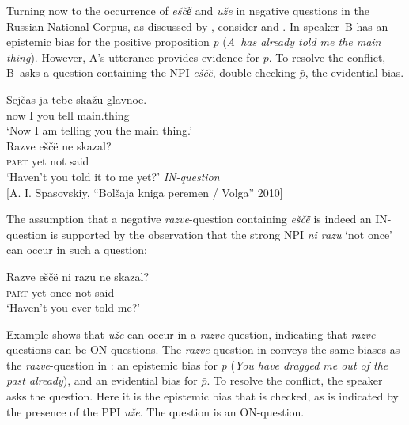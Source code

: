 \documentclass[output=paper,colorlinks,citecolor=brown]{langscibook}
\begin{document}
\noindent Turning now  to the occurrence of \textit{eščё} and \textit{uže} in negative questions in the Russian National Corpus, as discussed by \citet{ReppGeistToAppear}, consider  and . In  speaker~B has an epistemic bias for the positive proposition \textit{p} (\textit{A~has already told me the main thing}). However, A’s utterance provides evidence for $\bar{p}$. To resolve the conflict, B~asks a question containing the NPI \textit{eščë}, double-checking $\bar{p}$, the evidential bias.


\ea\label{geist-repp:ex:skazuGlavnoe}
\begin{xlist}[M:]
     \gll Sejčas	ja	tebe	skažu	glavnoe.\\
now	I	you	tell	main.thing\\
\glt ‘Now I am telling you the main thing.’\\
\gll Razve	eščë	ne	skazal?\\
\textsc{part}	yet	not	said\\
\glt ‘Haven't you told it to me yet?’ \hfill \textit{IN-question}\\
\hfill [A. I. Spasovskiy, “Bolšaja kniga peremen / Volga” 2010]
\end{xlist}
\z

\noindent The assumption that a negative \textit{razve}-question containing \textit{eščë} is indeed an IN-question is supported by the observation that the strong NPI \textit{ni razu} ‘not once’ can occur in such a question:

\ea\label{geist-repp:ex:razveNiRazuNeSkazal}{
\gll Razve	eščë ni razu ne	skazal?\\
\textsc{part} yet {\NEG} once	not	said\\
\glt ‘Haven’t you ever told me?’
}
\z

\noindent Example  shows that \textit{uže} can occur in a \textit{razve}-question, indicating that \textit{razve}-questions can be ON-questions. The \textit{razve}-question in  conveys the same biases as the \textit{razve}-question in : an epistemic bias for \textit{p} (\textit{You have dragged me out of the past already}), and an evidential bias for $\bar{p}$. To resolve the conflict, the speaker asks the question. Here it is the epistemic bias that is checked, as is indicated by the presence of the PPI \textit{uže}. The question is an ON-question.
\end{document}
